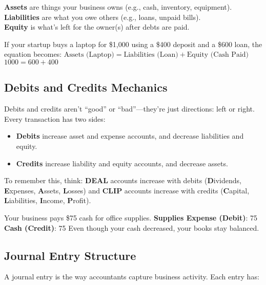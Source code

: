 \begin{Definition}
\textbf{Assets} are things your business owns (e.g., cash, inventory, equipment).\\
\textbf{Liabilities} are what you owe others (e.g., loans, unpaid bills).\\
\textbf{Equity} is what’s left for the owner(s) after debts are paid.
\end{Definition}

\begin{Example}
If your startup buys a laptop for \$1,000 using a \$400 deposit and a \$600 loan, the equation becomes:
$\text{Assets (Laptop)} = \text{Liabilities (Loan)} + \text{Equity (Cash Paid)}$
$1000 = 600 + 400$
\end{Example}

\subsection{Debits and Credits Mechanics}
Debits and credits aren’t “good” or “bad”—they’re just directions: left or right. Every transaction has two sides:

\begin{itemize}
\item \textbf{Debits} increase asset and expense accounts, and decrease liabilities and equity.
\item \textbf{Credits} increase liability and equity accounts, and decrease assets.
\end{itemize}

\begin{Tip}
To remember this, think: \textbf{DEAL} accounts increase with debits (\textbf{D}ividends, \textbf{E}xpenses, \textbf{A}ssets, \textbf{L}osses) and \textbf{CLIP} accounts increase with credits (\textbf{C}apital, \textbf{L}iabilities, \textbf{I}ncome, \textbf{P}rofit).
\end{Tip}

\begin{Example}
Your business pays \$75 cash for office supplies.\newline
\textbf{Supplies Expense (Debit)}: 75\newline
\textbf{Cash (Credit)}: 75\newline
Even though your cash decreased, your books stay balanced.
\end{Example}

\subsection{Journal Entry Structure}
A journal entry is the way accountants capture business activity. Each entry has:

